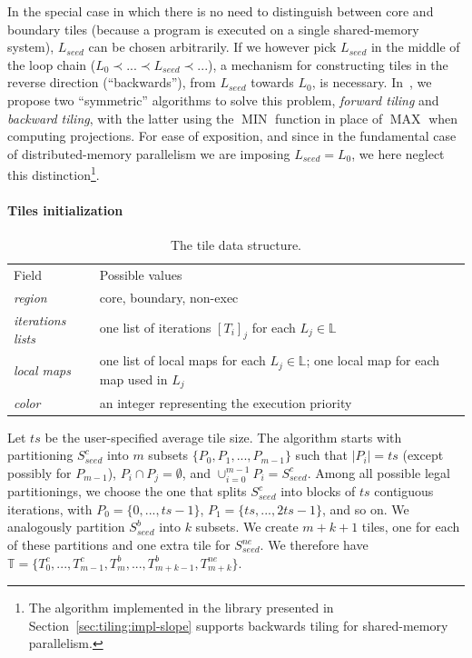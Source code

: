 In the special case in which there is no need to distinguish between core and boundary tiles (because a program is executed on a single shared-memory system), $L_{seed}$ can be chosen arbitrarily. If we however pick $L_{seed}$ in the middle of the loop chain ($L_0 \prec ... \prec L_{seed} \prec ...$), a mechanism for constructing tiles in the reverse direction (``backwards''), from $L_{seed}$ towards $L_0$, is necessary. In~\cite{st-paper}, we propose two ``symmetric'' algorithms to solve this problem, \textit{forward tiling} and \textit{backward tiling}, with the latter using the $\operatorname{MIN}$ function in place of $\operatorname{MAX}$ when computing projections. For ease of exposition, and since in the fundamental case of distributed-memory parallelism we are imposing $L_{seed} = L_0$, we here neglect this distinction\footnote{The algorithm implemented in the library presented in Section~\ref{sec:tiling:impl-slope} supports backwards tiling for shared-memory parallelism.}. 




\paragraph{Tiles initialization}

\begin{table}[ht]
\centering
\begin{tabulary}{1.0\columnwidth}{P{2.7cm} | P{8.5cm}}
\hline
Field & Possible values \\
{\em region} & core, boundary, non-exec \\
{\em iterations lists} & one list of iterations $[T_i]_j$ for each $L_j \in \mathbb{L}$\\ 
{\em local maps} & one list of local maps for each $L_j \in \mathbb{L}$; one local map for each map used in $L_j$\\
{\em color} & an integer representing the execution priority \\ 
\hline
\end{tabulary}
\caption{The tile data structure.}
\label{table:st-tile-structure}
\end{table}

Let $ts$ be the user-specified average tile size. The algorithm starts with partitioning $S_{seed}^{c}$ into $m$ subsets $\lbrace P_0, P_1, ..., P_{m-1}\rbrace$ such that $|P_i| = ts$ (except possibly for $P_{m-1}$), $P_i \cap P_j = \emptyset$, and $\cup_{i = 0}^{m-1} P_i = S_{seed}^{c}$. Among all possible legal partitionings, we choose the one that splits $S_{seed}^c$ into blocks of $ts$ contiguous iterations, with $P_0 = \lbrace 0, ..., ts-1\rbrace$, $P_1 = \lbrace ts, ..., 2 ts - 1\rbrace$, and so on. We analogously partition $S_{seed}^{b}$ into $k$ subsets. We create $m+k+1$ tiles, one for each of these partitions and one extra tile for $S_{seed}^{ne}$. We therefore have $\mathbb{T} = \lbrace T_0^c, ..., T_{m-1}^c, T_m^{b}, ..., T_{m+k-1}^b, T_{m+k}^{ne} \rbrace$. 

